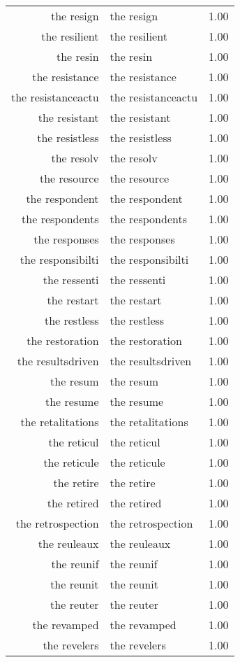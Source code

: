 \begin{table}[ht]
\begin{tabular}{rlr}
  the resign & the resign & 1.00 \\ 
  the resilient & the resilient & 1.00 \\ 
  the resin & the resin & 1.00 \\ 
  the resistance & the resistance & 1.00 \\ 
  the resistanceactu & the resistanceactu & 1.00 \\ 
  the resistant & the resistant & 1.00 \\ 
  the resistless & the resistless & 1.00 \\ 
  the resolv & the resolv & 1.00 \\ 
  the resource & the resource & 1.00 \\ 
  the respondent & the respondent & 1.00 \\ 
  the respondents & the respondents & 1.00 \\ 
  the responses & the responses & 1.00 \\ 
  the responsibilti & the responsibilti & 1.00 \\ 
  the ressenti & the ressenti & 1.00 \\ 
  the restart & the restart & 1.00 \\ 
  the restless & the restless & 1.00 \\ 
  the restoration & the restoration & 1.00 \\ 
  the resultsdriven & the resultsdriven & 1.00 \\ 
  the resum & the resum & 1.00 \\ 
  the resume & the resume & 1.00 \\ 
  the retalitations & the retalitations & 1.00 \\ 
  the reticul & the reticul & 1.00 \\ 
  the reticule & the reticule & 1.00 \\ 
  the retire & the retire & 1.00 \\ 
  the retired & the retired & 1.00 \\ 
  the retrospection & the retrospection & 1.00 \\ 
  the reuleaux & the reuleaux & 1.00 \\ 
  the reunif & the reunif & 1.00 \\ 
  the reunit & the reunit & 1.00 \\ 
  the reuter & the reuter & 1.00 \\ 
  the revamped & the revamped & 1.00 \\ 
  the revelers & the revelers & 1.00 \\ 

\end{tabular}
\end{table}
